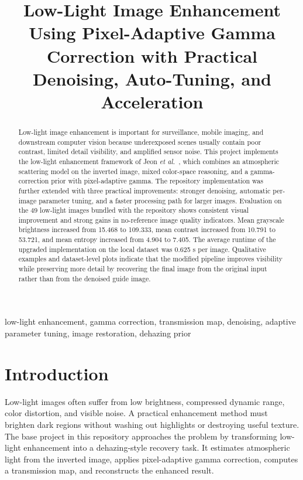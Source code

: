 \documentclass[conference]{IEEEtran}
\title{Low-Light Image Enhancement Using Pixel-Adaptive Gamma Correction with Practical Denoising, Auto-Tuning, and Acceleration}
\author{%
\IEEEauthorblockN{Project Report}
\IEEEauthorblockA{Low-Light Image Enhancement Study}
}
\begin{document}
\maketitle

\begin{abstract}
Low-light image enhancement is important for surveillance, mobile imaging, and downstream computer vision because underexposed scenes usually contain poor contrast, limited detail visibility, and amplified sensor noise. This project implements the low-light enhancement framework of Jeon \textit{et al.}~\cite{jeon2023}, which combines an atmospheric scattering model on the inverted image, mixed color-space reasoning, and a gamma-correction prior with pixel-adaptive gamma. The repository implementation was further extended with three practical improvements: stronger denoising, automatic per-image parameter tuning, and a faster processing path for larger images. Evaluation on the 49 low-light images bundled with the repository shows consistent visual improvement and strong gains in no-reference image quality indicators. Mean grayscale brightness increased from 15.468 to 109.333, mean contrast increased from 10.791 to 53.721, and mean entropy increased from 4.904 to 7.405. The average runtime of the upgraded implementation on the local dataset was 0.625 s per image. Qualitative examples and dataset-level plots indicate that the modified pipeline improves visibility while preserving more detail by recovering the final image from the original input rather than from the denoised guide image.
\end{abstract}

\begin{IEEEkeywords}
low-light enhancement, gamma correction, transmission map, denoising, adaptive parameter tuning, image restoration, dehazing prior
\end{IEEEkeywords}

\section{Introduction}
Low-light images often suffer from low brightness, compressed dynamic range, color distortion, and visible noise. A practical enhancement method must brighten dark regions without washing out highlights or destroying useful texture. The base project in this repository approaches the problem by transforming low-light enhancement into a dehazing-style recovery task. It estimates atmospheric light from the inverted image, applies pixel-adaptive gamma correction, computes a transmission map, and reconstructs the enhanced result.
\end{document}
